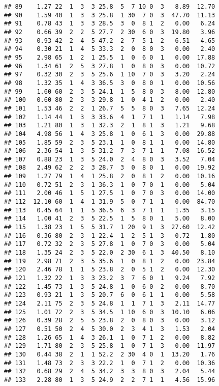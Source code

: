 \documentclass[
]{article}
\begin{document}
\begin{verbatim}
## 89    1.27 22  1  3  3 25.8  5  7 10 0  3   8.89  12.70
## 90    1.59 40  1  3  3 25.8  1 30  7 0  3  47.70  11.13
## 91    0.78 43  1  3  3 28.5  3  0  8 1  2   0.00   6.24
## 92    0.66 39  2  2  5 27.7  2 30  6 0  3  19.80   3.96
## 93    0.93 42  2  4  5 47.2  2  7  5 1  2   6.51   4.65
## 94    0.30 21  1  4  5 33.3  2  0  8 0  3   0.00   2.40
## 95    2.98 65  1  2  1 25.5  1  0  6 0  1   0.00  17.88
## 96    1.34 61  2  5  3 27.8  1  0  8 0  3   0.00  10.72
## 97    0.32 30  2  3  5 25.6  1 10  7 0  3   3.20   2.24
## 98    1.32 35  1  4  3 36.5  3  0  8 0  1   0.00  10.56
## 99    1.60 60  2  3  5 24.1  1  5  8 0  3   8.00  12.80
## 100   0.60 80  2  3  3 29.8  1  0  4 1  2   0.00   2.40
## 101   1.53 46  2  2  1 26.7  5  5  8 0  3   7.65  12.24
## 102   1.14 44  1  3  3 33.6  4  1  7 1  1   1.14   7.98
## 103   1.21 80  1  3  1 32.3  2  1  8 1  3   1.21   9.68
## 104   4.98 56  1  4  3 25.8  1  0  6 1  3   0.00  29.88
## 105   1.85 59  2  3  5 23.1  1  0  8 1  1   0.00  14.80
## 106   2.36 54  1  3  5 31.2  7  3  7 1  1   7.08  16.52
## 107   0.88 23  1  3  5 24.0  2  4  8 0  3   3.52   7.04
## 108   2.49 62  2  2  3 28.7  3  0  8 0  1   0.00  19.92
## 109   1.27 79  1  4  1 25.8  2  0  8 1  2   0.00  10.16
## 110   0.72 51  2  3  1 36.3  1  0  7 0  1   0.00   5.04
## 111   2.00 46  1  5  1 27.5  1  0  7 0  3   0.00  14.00
## 112  12.10 60  1  4  1 31.9  5  0  7 1  1   0.00  84.70
## 113   0.45 64  1  1  5 36.5  6  3  7 1  1   1.35   3.15
## 114   1.00 41  2  3  5 22.5  1  5  8 0  1   5.00   8.00
## 115   1.38 23  1  5  5 31.7  1 20  9 1  3  27.60  12.42
## 116   0.36 80  2  3  1 22.4  1  2  5 1  3   0.72   1.80
## 117   0.72 32  2  3  5 27.8  1  0  7 0  3   0.00   5.04
## 118   1.35 24  2  3  5 22.0  2 30  6 1  3  40.50   8.10
## 119   2.98 71  2  3  5 35.6  1  0  8 1  2   0.00  23.84
## 120   2.46 78  1  1  5 23.8  2  0  5 1  2   0.00  12.30
## 121   1.32 22  1  3  3 23.2  3  7  6 0  1   9.24   7.92
## 122   1.45 73  1  3  5 24.8  1  0  6 0  2   0.00   8.70
## 123   0.93 21  1  3  5 20.7  6  0  6 1  1   0.00   5.58
## 124   2.11 75  2  3  5 24.8  1  1  7 1  3   2.11  14.77
## 125   1.01 72  2  3  5 34.5  1 10  6 0  3  10.10   6.06
## 126   0.39 28  2  5  5 23.8  2  0  8 0  3   0.00   3.12
## 127   0.51 50  2  4  5 30.0  2  3  4 1  3   1.53   2.04
## 128   1.26 65  1  4  3 26.1  1  0  7 1  2   0.00   8.82
## 129   1.71 80  2  3  5 25.8  1  0  7 1  3   0.00  11.97
## 130   0.44 38  2  1  1 52.2  2 30  4 0  1  13.20   1.76
## 131   1.48 73  2  3  3 22.2  1  0  7 1  2   0.00  10.36
## 132   0.68 29  2  4  5 34.2  3  3  8 0  3   2.04   5.44
## 133   2.28 80  1  3  5 24.9  2  2  7 1  1   4.56  15.96

\end{verbatim}
\end{document}
